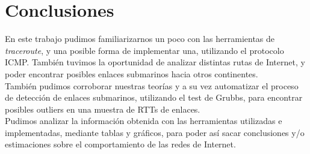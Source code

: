 \section{Conclusiones}

En este trabajo pudimos familiarizarnos un poco con las herramientas de \textit{traceroute}, y una posible forma de implementar una, utilizando el protocolo ICMP. También tuvimos la oportunidad de analizar distintas rutas de Internet, y poder encontrar posibles enlaces submarinos hacia otros continentes.\\

También pudimos corroborar nuestras teorías y a su vez automatizar el proceso de detección de enlaces submarinos, utilizando el test de Grubbs, para encontrar posibles outliers en una muestra de RTTs de enlaces.\\

Pudimos analizar la información obtenida con las herramientas utilizadas e implementadas, mediante tablas y gráficos, para poder así sacar conclusiones y/o estimaciones sobre el comportamiento de las redes de Internet.
